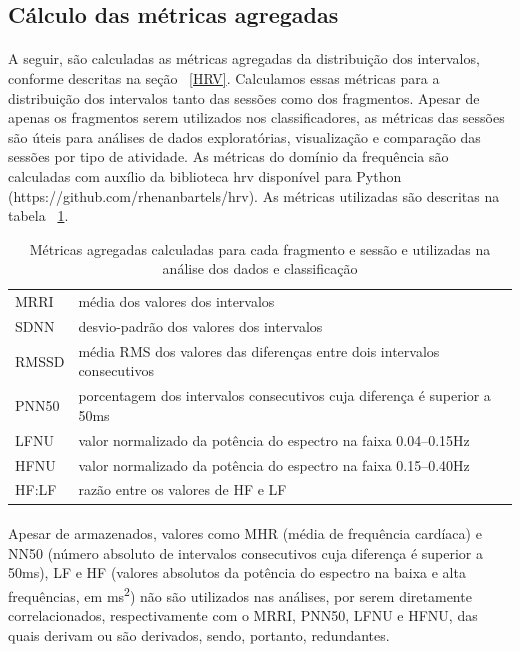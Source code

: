         \subsection{Cálculo das métricas agregadas}
        
            \paragraph{}A seguir, são calculadas as métricas agregadas da distribuição dos intervalos, conforme descritas na seção ~\ref{HRV}. Calculamos essas métricas para a distribuição dos intervalos tanto das sessões como dos fragmentos. Apesar de apenas os fragmentos serem utilizados nos classificadores, as métricas das sessões são úteis para análises de dados exploratórias, visualização e comparação das sessões por tipo de atividade. As métricas do domínio da frequência são calculadas com auxílio da biblioteca hrv disponível para Python (https://github.com/rhenanbartels/hrv). As métricas utilizadas são descritas na tabela ~\ref{feats}.
  
            \begin{table}[h!]
                \centering
                \begin{tabular}{ll}
                MRRI  & média dos valores dos intervalos                             \\
                SDNN  & desvio-padrão dos valores dos intervalos                     \\
                RMSSD & média RMS dos valores das diferenças entre dois intervalos consecutivos \\
                PNN50 & porcentagem dos intervalos consecutivos cuja diferença é superior a 50ms \\
                LFNU  & valor normalizado da potência do espectro na faixa 0.04–0.15Hz\\
                HFNU  & valor normalizado da potência do espectro na faixa 0.15–0.40Hz\\
                HF:LF & razão entre os valores de HF e LF
                \end{tabular}
                \caption{Métricas agregadas calculadas para cada fragmento e sessão e utilizadas na análise dos dados e classificação}
                \label{feats}
            \end{table}
            
            \paragraph{}Apesar de armazenados, valores como MHR (média de frequência cardíaca) e NN50 (número absoluto de intervalos consecutivos cuja diferença é superior a 50ms), LF e HF (valores absolutos da potência do espectro na baixa e alta frequências, em ms\textsuperscript{2}) não são utilizados nas análises, por serem diretamente correlacionados, respectivamente com o MRRI, PNN50, LFNU e HFNU, das quais derivam ou são derivados, sendo, portanto, redundantes. 
            
